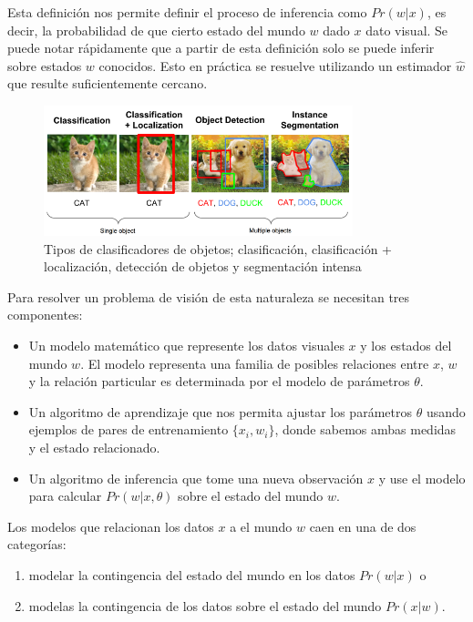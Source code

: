 \documentclass[letter,12pt]{report}
\begin{document}
Esta definición nos permite definir el proceso de inferencia como $Pr(w|x)$, es decir, la
probabilidad de que cierto estado del mundo $w$ dado $x$ dato visual. Se puede notar
rápidamente que a partir de esta definición solo se puede inferir sobre estados $w$
conocidos. Esto en práctica se resuelve utilizando un estimador $\hat{w}$ que resulte
suficientemente cercano.

\begin{figure}[H]
    \centering
    \includegraphics[width=0.8\textwidth]{obclass}
    \caption{Tipos de clasificadores de objetos; clasificación, clasificación +
    localización, detección de objetos y segmentación intensa}
    \label{fig:obclass}
\end{figure}

Para resolver un problema de visión de esta naturaleza se necesitan tres componentes:
\begin{itemize}
    \item Un modelo matemático que represente los datos visuales $x$ y los estados del
        mundo $w$. El modelo representa una familia de posibles relaciones entre $x$, 
        $w$ y la relación particular es determinada por el modelo de parámetros $\theta$.
    \item Un algoritmo de aprendizaje que nos permita ajustar los parámetros $\theta$
        usando ejemplos de pares de entrenamiento $\{x_i, w_i\}$, donde sabemos ambas
        medidas y el estado relacionado.
    \item Un algoritmo de inferencia que tome una nueva observación $x$ y use el modelo
        para calcular $Pr(w|x, \theta)$ sobre el estado del mundo $w$.
\end{itemize}

Los modelos que relacionan los datos $x$ a el mundo $w$ caen en una de dos categorías:
\begin{enumerate}
    \item modelar la contingencia del estado del mundo en los datos $Pr(w|x)$ o
    \item modelas la contingencia de los datos sobre el estado del mundo $Pr(x|w)$.
\end{enumerate}
\end{document}

